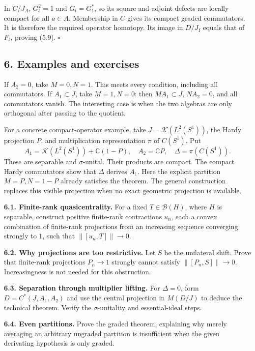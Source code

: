 \documentclass[
  11pt,
]{article}
\begin{document}
In \(C/J_A\), \(G_t^2=1\) and \(G_t=G_t^*\), so its square and adjoint
defects are locally compact for all \(a\in A\). Membership in \(C\)
gives its compact graded commutators. It is therefore the required
operator homotopy. Its image in \(D/J_I\) equals that of \(F_t\),
proving (5.9). \(\square\)

\subsection{6. Examples and exercises}\label{examples-and-exercises}

If \(A_2=0\), take \(M=0,N=1\). This meets every condition, including
all commutators. If \(A_1\subset J\), take \(M=1,N=0\): then
\(MA_1\subset J\), \(NA_2=0\), and all commutators vanish. The
interesting case is when the two algebras are only orthogonal after
passing to the quotient.

For a concrete compact-operator example, take
\(J=\mathcal K(L^2(S^1))\), the Hardy projection \(P\), and
multiplication representation \(\pi\) of \(C(S^1)\). Put \[
A_1=\mathcal K(L^2(S^1))+\mathbb C(1-P),\quad
A_2=\mathbb CP,\quad \Delta=\pi(C(S^1)).
\tag{6.1}
\] These are separable and \(\sigma\)-unital. Their products are
compact. The compact Hardy commutators show that \(\Delta\) derives
\(A_1\). Here the explicit partition \(M=P,N=1-P\) already satisfies the
theorem. The general construction replaces this visible projection when
no exact geometric projection is available.

\textbf{6.1. Finite-rank quasicentrality.} For a fixed
\(T\in\mathcal B(H)\), where \(H\) is separable, construct positive
finite-rank contractions \(u_n\), each a convex combination of
finite-rank projections from an increasing sequence converging strongly
to \(1\), such that \(\|[u_n,T]\|\to0\).

\textbf{6.2. Why projections are too restrictive.} Let \(S\) be the
unilateral shift. Prove that finite-rank projections \(P_n\to1\)
strongly cannot satisfy \(\|[P_n,S]\|\to0\). Increasingness is not
needed for this obstruction.

\textbf{6.3. Separation through multiplier lifting.} For \(\Delta=0\),
form \(D=C^*(J,A_1,A_2)\) and use the central projection in \(M(D/J)\)
to deduce the technical theorem. Verify the \(\sigma\)-unitality and
essential-ideal steps.

\textbf{6.4. Even partitions.} Prove the graded theorem, explaining why
merely averaging an arbitrary ungraded partition is insufficient when
the given derivating hypothesis is only graded.
\end{document}
